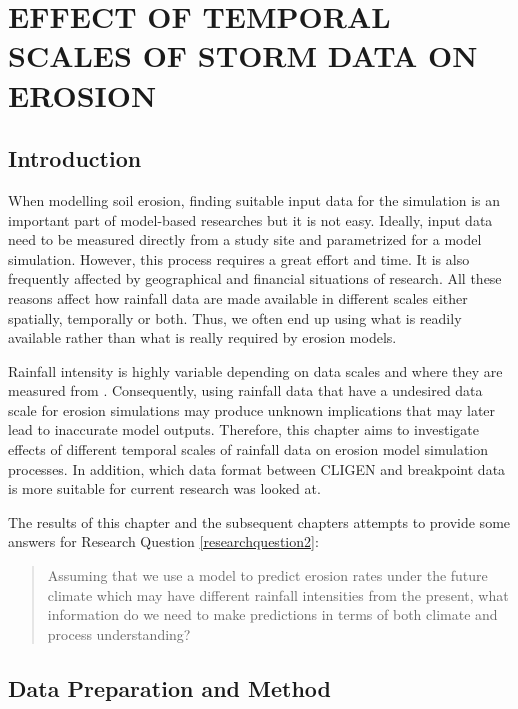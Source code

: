 \chapter{EFFECT OF TEMPORAL SCALES OF STORM DATA ON EROSION}
\label{sec:EFFECTSOFTEMPORALSCALESOFSTROMDATA}

\section{Introduction}
\label{sec:TemporalScalesEffectsIntroduction}

When modelling soil erosion, finding suitable input data for the simulation is
an important part of model-based researches but it is not easy. Ideally, input
data need to be measured directly from a study site and parametrized for a model
simulation. However, this process requires a great effort and time. It is also
frequently affected by geographical and financial situations of research. All
these reasons affect how rainfall data are made available in different scales
either spatially, temporally or both. Thus, we often end up using what is
readily available rather than what is really required by erosion models.

Rainfall intensity is highly variable depending on data scales and where they
are measured from \citep{nyssen2005-172}. Consequently, using rainfall data
that have a undesired data scale for erosion simulations may produce unknown
implications that may later lead to inaccurate model outputs. Therefore, this
chapter aims to investigate effects of different temporal scales of rainfall
data on erosion model simulation processes. In addition, which data format
between CLIGEN and breakpoint data is more suitable for current research was
looked at.

The results of this chapter and the subsequent chapters attempts to provide some
answers for Research Question \ref{researchquestion2}:\
\begin{quotation}
Assuming that we use a model to predict erosion rates under the future climate
which may have different rainfall intensities from the present, what information
do we need to make predictions in terms of both climate and process
understanding?
\end{quotation}

\section{Data Preparation and Method}
\label{sec:TemporalScalesEffectsMethods}

